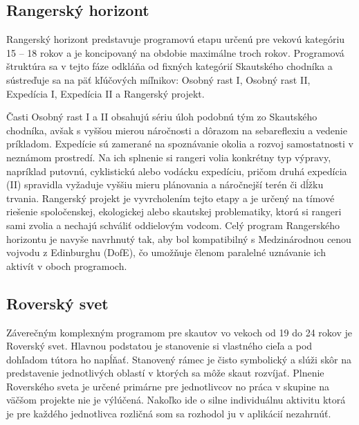 \subsection{Rangerský horizont}
Rangerský horizont predstavuje programovú etapu určenú pre vekovú kategóriu 15 – 18 rokov a je koncipovaný na obdobie maximálne troch rokov. Programová štruktúra sa v tejto fáze odkláňa od fixných kategórií Skautského chodníka a sústreďuje sa na päť kľúčových míľnikov: Osobný rast I, Osobný rast II, Expedícia I, Expedícia II a Rangerský projekt.

Časti Osobný rast I a II obsahujú sériu úloh podobnú tým zo Skautského chodníka, avšak s vyššou mierou náročnosti a dôrazom na sebareflexiu a vedenie príkladom. Expedície sú zamerané na spoznávanie okolia a rozvoj samostatnosti v neznámom prostredí. Na ich splnenie si rangeri volia konkrétny typ výpravy, napríklad putovnú, cyklistickú alebo vodácku expedíciu, pričom druhá expedícia (II) spravidla vyžaduje vyššiu mieru plánovania a náročnejší terén či dĺžku trvania. Rangerský projekt je vyvrcholením tejto etapy a je určený na tímové riešenie spoločenskej, ekologickej alebo skautskej problematiky, ktorú si rangeri sami zvolia a nechajú schváliť oddielovým vodcom. Celý program Rangerského horizontu je navyše navrhnutý tak, aby bol kompatibilný s Medzinárodnou cenou vojvodu z Edinburghu (DofE), čo umožňuje členom paralelné uznávanie ich aktivít v oboch programoch.\cite{rangersky_horizont}

\subsection{Roverský svet}
Záverečným komplexným programom pre skautov vo vekoch od 19 do 24 rokov je Roverský svet. Hlavnou podstatou je stanovenie si vlastného cieľa a pod dohľadom tútora ho napĺňať. Stanovený rámec je čisto symbolický a slúži skôr na predstavenie jednotlivých oblastí v ktorých sa môže skaut rozvíjať. Plnenie Roverského sveta je určené primárne pre jednotlivcov no práca v skupine na väčšom projekte nie je výlúčená. Nakoľko ide o silne individuálnu aktivitu ktorá je pre každého jednotlivca rozličná som sa rozhodol ju v aplikácií nezahrnúť. \cite{roversky_svet}

